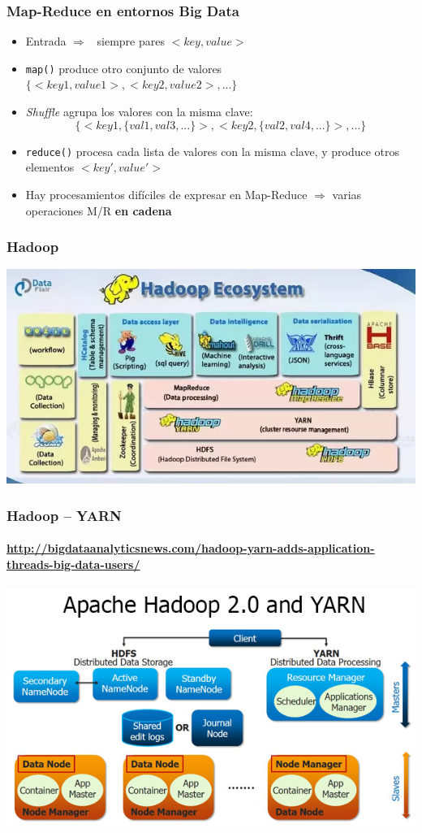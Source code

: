 \documentclass[14pt]{beamer}
\newcommand{\ra}{{\color{mdwrojo} $\Rightarrow${}~{}}}
\begin{document}
\begin{frame}
\frametitle{Map-Reduce en entornos Big Data}
\begin{itemize}
  \item Entrada \ra{} siempre pares $<key,value>$

  \item {\tt map()} produce otro conjunto de valores
    $\{<key1,value1>,<key2,value2>,...\}$

\item {\em Shuffle} agrupa los valores con la misma clave:
\begin{displaymath}
\{<key1,\{val1,val3,...\}>,<key2,\{val2,val4,...\}>,...\}
\end{displaymath}

\item {\tt reduce()} procesa cada lista de valores con la misma clave, y
  produce otros elementos $<key',value'>$

\item Hay procesamientos difíciles de expresar en Map-Reduce $\Rightarrow$
  varias operaciones M/R {\bf en cadena}
  \end{itemize}

\end{frame}

\begin{frame}
  \frametitle{Hadoop}
\includegraphics[width=\textwidth]{img/hadoop}
\end{frame}

\begin{frame}
  \frametitle{Hadoop -- YARN}
 \framesubtitle{\url{http://bigdataanalyticsnews.com/hadoop-yarn-adds-application-threads-big-data-users/}}
  \includegraphics[width=\textwidth]{img/hadoop-yarn}
\end{frame}
\end{document}
